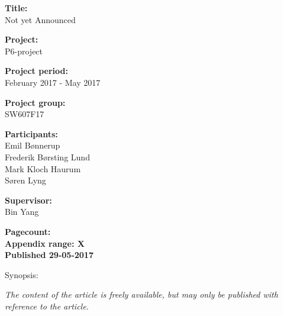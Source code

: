 \begin{minipage}[t]{0.48\textwidth}
\textbf{Title:} \\[5pt]\bigskip\hspace{2ex}
Not yet Announced

\textbf{Project:} \\[5pt]\bigskip\hspace{2ex}
P6-project

\textbf{Project period:} \\[5pt]\bigskip\hspace{2ex}
February 2017 - May 2017

\textbf{Project group:} \\[5pt]\bigskip\hspace{2ex}
SW607F17	

\textbf{Participants:} \\[5pt]\hspace*{2ex}
Emil Bønnerup \\\hspace*{2ex}
Frederik Børsting Lund \\\hspace*{2ex}
Mark Kloch Haurum \\\hspace*{2ex}
Søren Lyng \\\hspace*{2ex}

\textbf{Supervisor:} \\[5pt]\hspace*{2ex}
Bin Yang

\vspace*{1cm}


\textbf{Pagecount: \pageref{LastPage}} \\
\textbf{Appendix range: X} \\ 
\textbf{Published 29-05-2017}

\end{minipage}
\hfill
\begin{minipage}[t]{0.483\textwidth}
Synopsis: \\[5pt]
\fbox{\parbox{7cm}{\bigskip\bigskip}}
\end{minipage}

\vfill

{\footnotesize\itshape The content of the article is freely available, but may only be published with reference to the article.}

